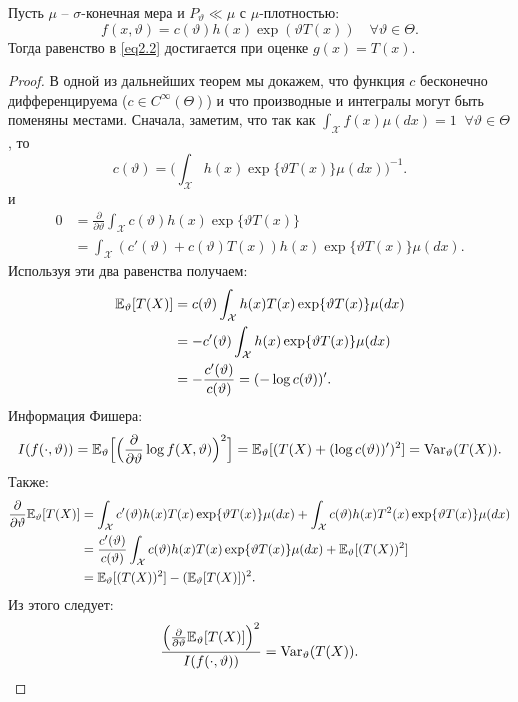 \begin{prps} \label{prps2.31}
	Пусть $\mu$ -- $\sigma$-конечная мера и $P_\vartheta \ll \mu$ с $\mu$-плотностью:
	\[f(x, \vartheta) = c(\vartheta) h(x) \exp(\vartheta T(x)) \quad \forall \vartheta \in \Theta. \]
	Тогда равенство в \eqref{eq2.2} достигается при оценке $g(x)=T(x)$.
\end{prps}
\begin{proof}
	В одной из дальнейших теорем мы докажем, что функция $c$ бесконечно дифференцируема ($c \in C^{\infty}(\Theta)$) и что производные и интегралы могут быть поменяны местами. Сначала, заметим, что так как $\int_{\mathcal{X}}f(x)\mu(dx) = 1 \; \; \forall \vartheta \in \Theta$, то
	\[ c(\vartheta)=\Big( \int_{\mathcal{X}} h(x)\exp \{ \vartheta T(x) \} \mu(dx) \Big)^{-1}. \]
	и
	\[ 
	\begin{aligned}
	0 & = \frac{\partial}{\partial \vartheta} \int_{\mathcal{X}} c(\vartheta) h(x) \exp \{ \vartheta T(x) \} \\
	& = \int_{\mathcal{X}} (c'(\vartheta)+c(\vartheta)T(x)) h(x) \exp \{ \vartheta T(x) \} \mu(dx).
	\end{aligned}
	 \]
	 Используя эти два равенства получаем:
	 \[ 
	 \begin{aligned}
	 \mathbb{E}_\vartheta[T(X)] & = c(\vartheta) \int_{\mathcal{X}} h(x) T(x) \exp \{ \vartheta T(x) \}\mu(dx) \\
	 & = -c'(\vartheta) \int_{\mathcal{X}}h(x) \exp \{ \vartheta T(x) \}\mu(dx) \\
	 & = -\frac{c'(\vartheta)}{c(\vartheta)}=(-\log c(\vartheta))'.
	 \end{aligned}
	 \]
	 Информация Фишера:
	 \[ 
	 I(f(\cdot, \vartheta)) = \mathbb{E}_\vartheta\Big[\Big( \frac{\partial}{\partial \vartheta} \log f(X, \vartheta) \Big)^2\Big]=\mathbb{E}_\vartheta[(T(X)+(\log c(\vartheta))')^2]=\operatorname{Var}_\vartheta(T(X)).
	 \]
	 Также:
	 \[
	 \begin{aligned}
	 \frac{\partial}{\partial \vartheta} \mathbb{E}_\vartheta[T(X)] & =\int_{\mathcal{X}} c'(\vartheta) h(x) T(x) \exp \{ \vartheta T(x) \} \mu(dx) + \int_{\mathcal{X}} c(\vartheta) h(x) T^2(x) \exp \{ \vartheta T(x) \} \mu(dx) \\
	 & = \frac{c'(\vartheta)}{c(\vartheta)} \int_{\mathcal{X}} c(\vartheta) h(x) T(x) \exp \{ \vartheta T(x) \} \mu(dx) + \mathbb{E}_\vartheta[(T(X))^2] \\
	 & = \mathbb{E}_\vartheta[(T(X))^2] - (\mathbb{E}_\vartheta[T(X)])^2.
	 \end{aligned}
	 \]
	 Из этого следует:
	 \[ \frac{\Big(\frac{\partial}{\partial\vartheta}\mathbb{E}_\vartheta[T(X)] \Big)^2}{I(f(\cdot, \vartheta))}= \operatorname{Var}_\vartheta(T(X)). \] 
\end{proof}

